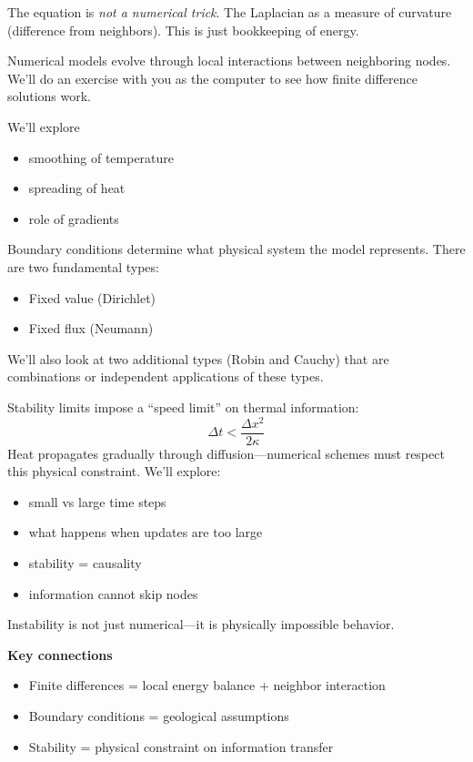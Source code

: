 The equation is \emph{not a numerical trick}.  The Laplacian as a measure of curvature (difference from neighbors).  This is just bookkeeping of energy.


Numerical models evolve through local interactions between neighboring nodes. We'll do an exercise with you as the computer to see how finite difference solutions work.

We'll explore
\begin{itemize}
    \item smoothing of temperature
    \item spreading of heat
    \item role of gradients
\end{itemize}



Boundary conditions determine what physical system the model represents. There are two fundamental types:
\begin{itemize}
    \item Fixed value (Dirichlet)
    \item Fixed flux (Neumann)
\end{itemize}
We'll also look at two additional types (Robin and Cauchy) that are combinations or independent applications of these types.


Stability limits impose a ``speed limit'' on thermal information:
\[
    \Delta t < \frac{\Delta x^2}{2\kappa}
\]
Heat propagates gradually through diffusion---numerical schemes must respect this physical constraint. We'll explore:
\begin{itemize}
    \item small vs large time steps
    \item what happens when updates are too large
    \item stability = causality
    \item information cannot skip nodes
\end{itemize}

Instability is not just numerical---it is physically impossible behavior.


\textbf{Key connections}
\begin{itemize}
    \item Finite differences = local energy balance + neighbor interaction
    \item Boundary conditions = geological assumptions
    \item Stability = physical constraint on information transfer
\end{itemize}

